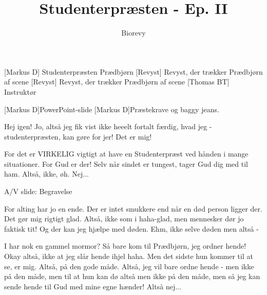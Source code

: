 \documentclass[a4paper,12pt]{article}
\title{Studenterpræsten - Ep. II}
\author{Biorevy}
\begin{document}
\maketitle




\begin{roles}
	[Markus D] Studenterpræsten Prædbjørn
[Revyst] Revyst, der trækker Prædbjørn af scene
[Revyst] Revyst, der trækker Prædbjørn af scene
	[Thomas BT] Instruktør
\end{roles}


\begin{props}
	[Markus D]PowerPoint-slide
	[Markus D]Præstekrave og baggy jeans.
\end{props}

\begin{sketch}




 Hej igen! Jo, altså jeg fik vist ikke heeelt fortalt færdig, hvad jeg - studenterpræsten, kan gøre for jer! Det er mig!

 For det er VIRKELIG vigtigt at have en Studenterpræst ved hånden i mange situationer. For Gud er der! Selv når sindet er tungest, tager Gud dig med til ham. Altså, ikke, øh. Nej... 

 A/V slide: Begravelse

 For alting har jo en ende. Der er intet smukkere end når en død person ligger der. Det gør mig rigtigt glad. Altså, ikke som i haha-glad, men mennesker dør jo faktisk tit! Og der kan jeg hjælpe med døden. Ehm, ikke selve døden men altså -

 I har nok en gammel mormor? Så bare kom til Prædbjørn, jeg ordner hende! Okay altså, ikke at jeg slår hende ihjel haha. Men det sidste hun kommer til at se, er mig. Altså, på den gode måde. Altså, jeg vil bare ordne hende - men ikke på den måde, men til at hun kan dø altså men ikke på den måde, men så jeg kan sende hende til Gud med mine egne hænder! Altså nej...


\end{sketch}
\end{document}
